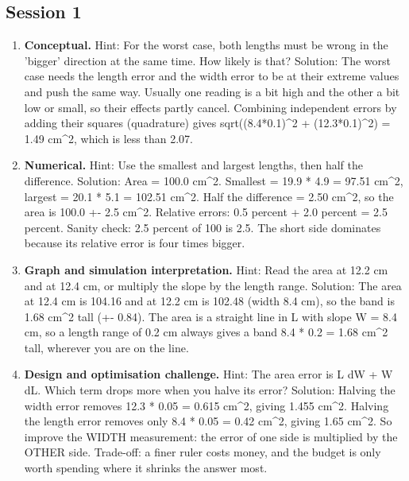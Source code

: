\documentclass[11pt,a4paper]{article}
\begin{document}
\subsection*{Session 1}
\begin{enumerate}[nosep]
\item \textbf{Conceptual.} Hint: For the worst case, both lengths must be wrong in the 'bigger' direction at the same time. How likely is that? Solution: The worst case needs the length error and the width error to be at their extreme values and push the same way. Usually one reading is a bit high and the other a bit low or small, so their effects partly cancel. Combining independent errors by adding their squares (quadrature) gives sqrt((8.4*0.1)\textasciicircum{}2 + (12.3*0.1)\textasciicircum{}2) = 1.49 cm\textasciicircum{}2, which is less than 2.07.
\item \textbf{Numerical.} Hint: Use the smallest and largest lengths, then half the difference. Solution: Area = 100.0 cm\textasciicircum{}2. Smallest = 19.9 * 4.9 = 97.51 cm\textasciicircum{}2, largest = 20.1 * 5.1 = 102.51 cm\textasciicircum{}2. Half the difference = 2.50 cm\textasciicircum{}2, so the area is 100.0 +- 2.5 cm\textasciicircum{}2. Relative errors: 0.5 percent + 2.0 percent = 2.5 percent. Sanity check: 2.5 percent of 100 is 2.5. The short side dominates because its relative error is four times bigger.
\item \textbf{Graph and simulation interpretation.} Hint: Read the area at 12.2 cm and at 12.4 cm, or multiply the slope by the length range. Solution: The area at 12.4 cm is 104.16 and at 12.2 cm is 102.48 (width 8.4 cm), so the band is 1.68 cm\textasciicircum{}2 tall (+- 0.84). The area is a straight line in L with slope W = 8.4 cm, so a length range of 0.2 cm always gives a band 8.4 * 0.2 = 1.68 cm\textasciicircum{}2 tall, wherever you are on the line.
\item \textbf{Design and optimisation challenge.} Hint: The area error is L dW + W dL. Which term drops more when you halve its error? Solution: Halving the width error removes 12.3 * 0.05 = 0.615 cm\textasciicircum{}2, giving 1.455 cm\textasciicircum{}2. Halving the length error removes only 8.4 * 0.05 = 0.42 cm\textasciicircum{}2, giving 1.65 cm\textasciicircum{}2. So improve the WIDTH measurement: the error of one side is multiplied by the OTHER side. Trade-off: a finer ruler costs money, and the budget is only worth spending where it shrinks the answer most.
\end{enumerate}
\end{document}
